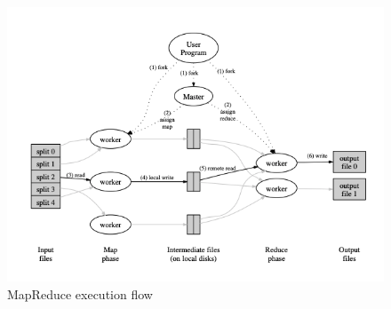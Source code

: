 \begin{figure}[!ht]
    \centering
    \includegraphics[scale=0.75]{document/appendix/appendix_1/images/mapreduce_execution_flow.png}
    \caption{MapReduce execution flow \cite{google_mapreduce}}
    \label{fig:mapreduce_execution_flow}
\end{figure}

